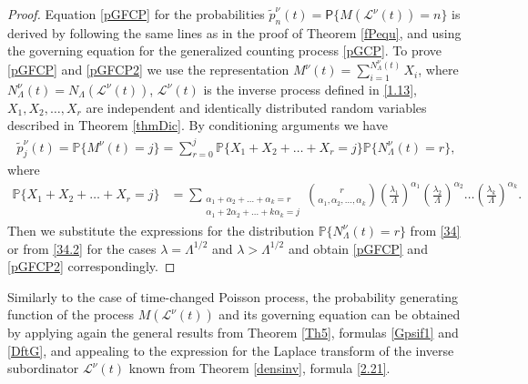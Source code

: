 \documentclass[12pt]{article}
\theoremstyle{definition}
\theoremstyle{plain}
\newcommand{\Prob}{\mathsf{P}}
\begin{document}
\begin{proof}
Equation \eqref{pGFCP} for the probabilities ${\tilde p}_n^\nu(t)=\Prob\{M(\mathcal{L}^\nu(t))=n\}$  is derived by following the same lines as in the proof of Theorem \ref{fPequ}, and using the governing equation for the generalized  counting process \eqref{pGCP}.
	To prove \eqref{pGFCP} and \eqref{pGFCP2} we use the representation $M^\nu(t) = \sum_{i=1}^{N_\Lambda^\nu(t)} X_i$, where $N_\Lambda^\nu(t)=N_\Lambda(\mathcal{L}^\nu(t))$,  $\mathcal{L}^\nu(t)$ is the inverse process defined in \eqref{1.13}, $X_1, X_2, \dots, X_r$ are independent and identically distributed random variables described in Theorem \ref{thmDic}. By conditioning arguments we have
	\begin{align*}
		\tilde p_j^\nu(t) = \mathbb{P}\{M^\nu(t) = j\} = \sum_{r=0}^j \mathbb{P}\{X_1 + X_2 + \dots + X_r = j\} \mathbb{P}\{N_\Lambda^\nu(t) = r\},
	\end{align*}
where
	\begin{align*}
		\mathbb{P}\{X_1 + X_2 + \dots + X_r = j\} &= \sum_{\substack{\alpha_1+\alpha_2+\dots+\alpha_k=r \\ \alpha_1+2\alpha_2+\dots+k\alpha_k=j}} \binom{r}{\alpha_1, \alpha_2, \dots, \alpha_k} %
		\left(\frac{\lambda_1}{\Lambda}\right)^{\alpha_1} \left(\frac{\lambda_2}{\Lambda}\right)^{\alpha_2} \dots \left(\frac{\lambda_k}{\Lambda}\right)^{\alpha_k}.
	\end{align*}
	Then we substitute the  expressions for the distribution $\mathbb{P}\{N_\Lambda^\nu(t) = r\}$ from \eqref{34} or from \eqref{34.2} for  the cases $\lambda=\Lambda^{1/2}$ and $\lambda>\Lambda^{1/2}$ and obtain \eqref{pGFCP} and \eqref{pGFCP2} correspondingly.    
\end{proof}



Similarly to the case of time-changed Poisson process, the probability generating function of the process $M(\mathcal{L}^\nu(t))$ and its governing equation can be obtained by applying again  the general results from Theorem \ref{Th5},  formulas \eqref{Gpsif1} and \eqref{DftG}, and appealing to  the expression for the Laplace transform of the inverse subordinator $\mathcal{L}^\nu(t)$ known from  Theorem \ref{densinv}, formula \eqref{2.21}. 
\end{document}
